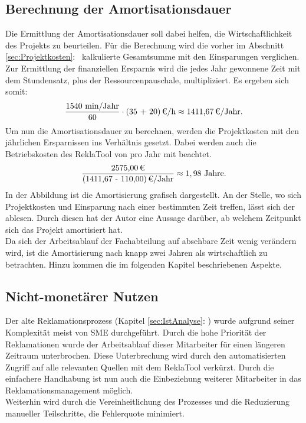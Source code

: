 \subsection*{Berechnung der Amortisationsdauer}
Die Ermittlung der Amortisationsdauer soll dabei helfen, die Wirtschaftlichkeit des Projekts zu beurteilen.
Für die Berechnung wird die vorher im Abschnitt  \ref{sec:Projektkosten}:~ kalkulierte Gesamtsumme 
mit den Einsparungen verglichen. 
Zur Ermittlung der finanziellen Ersparnis wird die jedes Jahr gewonnene Zeit mit dem Stundensatz, plus der Ressourcenpauschale,
multipliziert. Es ergeben sich somit:
\begin{eqnarray}
    \frac{1540 \mbox{ min/Jahr}}{60} \cdot \eur{(35 + 20)}\mbox{/h} \approx \eur{1411,67}\mbox{/Jahr}. 
\end{eqnarray}
Um nun die Amortisationsdauer zu berechnen, werden die Projektkosten mit den jährlichen Ersparnissen ins Verhältnis gesetzt.
Dabei werden auch die Betriebskosten des ReklaTool von  pro Jahr mit beachtet.
\begin{eqnarray}
    \frac{\eur{2575,00}}{\eur{(1411,67 - 110,00)}\mbox{/Jahr}} \approx 1,98 \mbox{ Jahre}.	
\end{eqnarray}
In der Abbildung  ist die Amortisierung grafisch dargestellt.
An der Stelle, wo sich Projektkosten und Einsparung nach einer bestimmten Zeit treffen, lässt sich der
 ablesen. Durch diesen hat der Autor eine Aussage darüber, ab welchem Zeitpunkt sich das Projekt amortisiert hat.\\
Da sich der Arbeitsablauf der Fachabteilung auf absehbare Zeit wenig verändern wird, ist die Amortisierung nach knapp zwei
Jahren als wirtschaftlich zu betrachten. Hinzu kommen die im folgenden Kapitel beschriebenen Aspekte.

\subsection{Nicht-monetärer Nutzen}
\label{sec:nichtMonetaererNutzen}
Der alte Reklamationsprozess (\Vgl Kapitel \ref{sec:IstAnalyse}: ) wurde aufgrund seiner Komplexität
meist von \ac{SME} durchgeführt. Durch die hohe Priorität der Reklamationen wurde der Arbeitsablauf dieser Mitarbeiter für 
einen längeren Zeitraum unterbrochen. Diese Unterbrechung wird durch den automatisierten Zugriff auf alle relevanten Quellen mit 
dem ReklaTool verkürzt. Durch die einfachere Handhabung ist nun auch die Einbeziehung weiterer Mitarbeiter in das 
Reklamationsmanagement möglich.\\
Weiterhin wird durch die Vereinheitlichung des Prozesses und die Reduzierung manueller Teilschritte, 
die Fehlerquote minimiert. 

